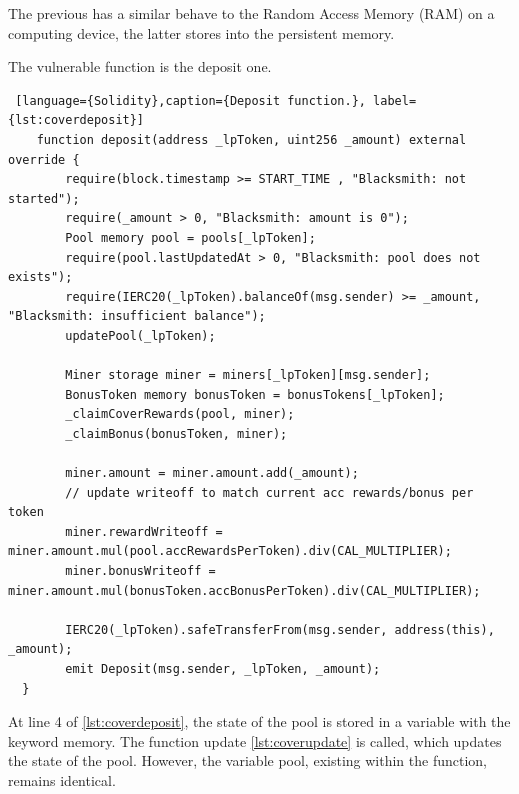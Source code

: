 The previous has a similar behave to the Random Access Memory (RAM) on a computing device, the latter stores into the persistent memory.

The vulnerable function is the deposit one.
\begin{lstlisting} [language={Solidity},caption={Deposit function.}, label={lst:coverdeposit}]
    function deposit(address _lpToken, uint256 _amount) external override {
        require(block.timestamp >= START_TIME , "Blacksmith: not started");
        require(_amount > 0, "Blacksmith: amount is 0");
        Pool memory pool = pools[_lpToken];
        require(pool.lastUpdatedAt > 0, "Blacksmith: pool does not exists");
        require(IERC20(_lpToken).balanceOf(msg.sender) >= _amount, "Blacksmith: insufficient balance");
        updatePool(_lpToken);

        Miner storage miner = miners[_lpToken][msg.sender];
        BonusToken memory bonusToken = bonusTokens[_lpToken];
        _claimCoverRewards(pool, miner);
        _claimBonus(bonusToken, miner);

        miner.amount = miner.amount.add(_amount);
        // update writeoff to match current acc rewards/bonus per token
        miner.rewardWriteoff = miner.amount.mul(pool.accRewardsPerToken).div(CAL_MULTIPLIER);
        miner.bonusWriteoff = miner.amount.mul(bonusToken.accBonusPerToken).div(CAL_MULTIPLIER);

        IERC20(_lpToken).safeTransferFrom(msg.sender, address(this), _amount);
        emit Deposit(msg.sender, _lpToken, _amount);
  }
\end{lstlisting}
At line 4 of \autoref{lst:coverdeposit}, the state of the pool is stored in a variable with the keyword memory. 
The function update \autoref{lst:coverupdate} is called, which updates the state of the pool. However, the variable pool, 
existing within the function, remains identical. 
